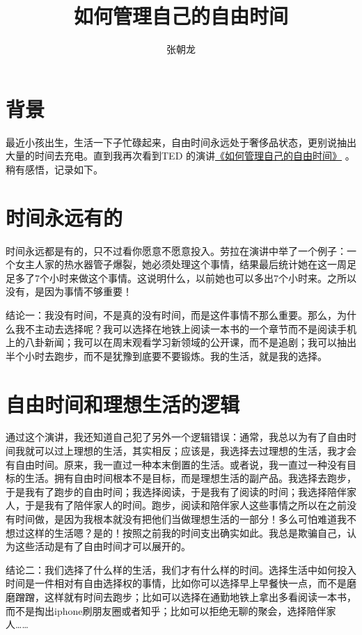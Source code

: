 \documentclass[10pt,a4paper,UTF8]{article}
\author{张朝龙}
\date{}
\title{如何管理自己的自由时间}
\begin{document}
\maketitle
\tableofcontents
{}

\section{背景}
\label{sec:org9e4c61b}
最近小孩出生，生活一下子忙碌起来，自由时间永远处于奢侈品状态，更别说抽出大量的时间去充电。直到我再次看到TED 的演讲\href{http://open.163.com/movie/2016/12/I/B/MC82BCQAN\_MC8U8L3IB.html}{《如何管理自己的自由时间》} 。稍有感悟，记录如下。

\section{时间永远有的}
\label{sec:orgc645955}

时间永远都是有的，只不过看你愿意不愿意投入。劳拉在演讲中举了一个例子：一个女主人家的热水器管子爆裂，她必须处理这个事情，结果最后统计她在这一周足足多了7个小时来做这个事情。这说明什么，以前她也可以多出7个小时来。之所以没有，是因为事情不够重要！

结论一：我没有时间，不是真的没有时间，而是这件事情不那么重要。那么，为什么我不主动去选择呢？我可以选择在地铁上阅读一本书的一个章节而不是阅读手机上的八卦新闻；我可以在周末观看学习新领域的公开课，而不是追剧；我可以抽出半个小时去跑步，而不是犹豫到底要不要锻炼。我的生活，就是我的选择。
\section{自由时间和理想生活的逻辑}
\label{sec:org7d566c7}


通过这个演讲，我还知道自己犯了另外一个逻辑错误：通常，我总以为有了自由时间我就可以过上理想的生活，其实相反；应该是，我选择去过理想的生活，我才会有自由时间。原来，我一直过一种本末倒置的生活。或者说，我一直过一种没有目标的生活。拥有自由时间根本不是目标，而是理想生活的副产品。我选择去跑步，于是我有了跑步的自由时间；我选择阅读，于是我有了阅读的时间；我选择陪伴家人，于是我有了陪伴家人的时间。跑步，阅读和陪伴家人这些事情之所以在之前没有时间做，是因为我根本就没有把他们当做理想生活的一部分！多么可怕难道我不想过这样的生活嗯？是的！按照之前我的时间支出确实如此。我总是欺骗自己，认为这些活动是有了自由时间才可以展开的。

结论二：我们选择了什么样的生活，我们才有什么样的时间。选择生活中如何投入时间是一件相对有自由选择权的事情，比如你可以选择早上早餐快一点，而不是磨磨蹭蹭，这样就有时间去跑步；比如可以选择在通勤地铁上拿出多看阅读一本书，而不是掏出iphone刷朋友圈或者知乎；比如可以拒绝无聊的聚会，选择陪伴家人\ldots{}\ldots{}
\end{document}
